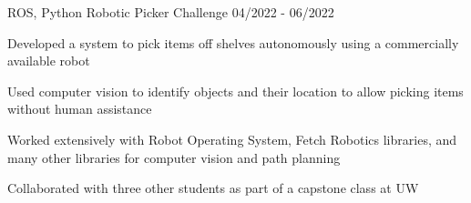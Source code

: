 
\begin{cventries}
    
  \cventry
    {ROS, Python}
    {Robotic Picker Challenge}
    {}
    {04/2022 - 06/2022}
    {
      \begin{cvitems}
        \item {Developed a system to pick items off shelves autonomously using a commercially available robot}
        \item {Used computer vision to identify objects and their location to allow picking items without human assistance}
        \item {Worked extensively with Robot Operating System, Fetch Robotics libraries, and many other libraries for computer vision and path planning}
        \item {Collaborated with three other students as part of a capstone class at UW}
      \end{cvitems}
    }



\end{cventries}
